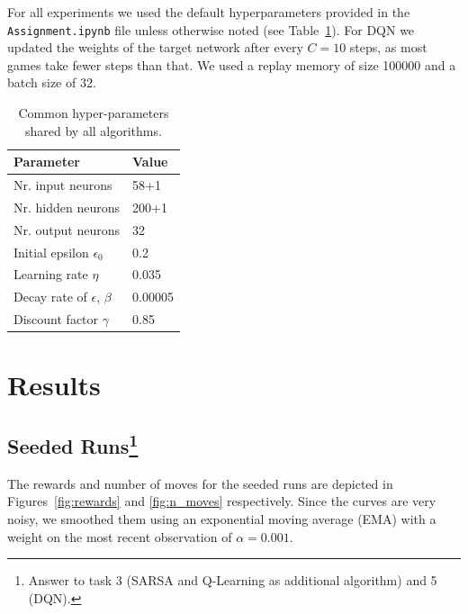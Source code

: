 \documentclass[conference]{IEEEtran}
\begin{document}
For all experiments we used the default hyperparameters provided in the \verb"Assignment.ipynb" file unless otherwise noted (see Table~\ref{tab:hyper-parameters}).
For DQN we updated the weights of the target network after every $C=10$ steps, as most games take fewer steps than that. We used a replay memory of size 100000 and a batch size of 32.


\begin{table}[h!]
    \centering
    \begin{tabular}{|l|l|}
    \hline
    \textbf{Parameter}                & \textbf{Value} \\ \hline
    Nr. input neurons                 & 58+1           \\ \hline
    Nr. hidden neurons                & 200+1          \\ \hline
    Nr. output neurons                & 32             \\ \hline
    Initial epsilon $\epsilon_0$      & 0.2            \\ \hline
    Learning rate $\eta$              & 0.035          \\ \hline
    Decay rate of $\epsilon$, $\beta$ & 0.00005        \\ \hline
    Discount factor $\gamma$          & 0.85           \\ \hline
    \end{tabular}
    \caption{Common hyper-parameters shared by all algorithms.}
    \label{tab:hyper-parameters}
\end{table}




\section{Results}\label{sec:results}

\subsection{Seeded Runs\footnote{Answer to task 3 (SARSA and Q-Learning as additional algorithm) and 5 (DQN).}}



The rewards and number of moves for the seeded runs are depicted in Figures~\ref{fig:rewards} and \ref{fig:n_moves} respectively. Since the curves are very noisy, we smoothed them using an exponential moving average (EMA) with a weight on the most recent observation of $\alpha = 0.001$.
\end{document}
